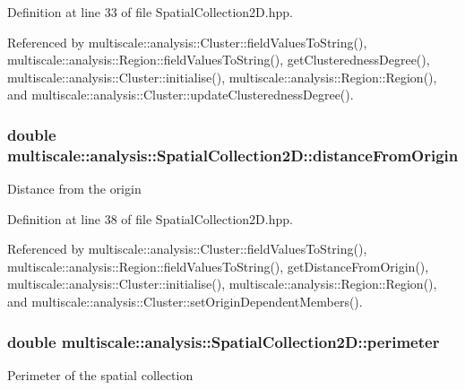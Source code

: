 Definition at line 33 of file Spatial\-Collection2\-D.\-hpp.



Referenced by multiscale\-::analysis\-::\-Cluster\-::field\-Values\-To\-String(), multiscale\-::analysis\-::\-Region\-::field\-Values\-To\-String(), get\-Clusteredness\-Degree(), multiscale\-::analysis\-::\-Cluster\-::initialise(), multiscale\-::analysis\-::\-Region\-::\-Region(), and multiscale\-::analysis\-::\-Cluster\-::update\-Clusteredness\-Degree().

\hypertarget{classmultiscale_1_1analysis_1_1SpatialCollection2D_ac2a5d3f8c2cb878c710d821c536b8a4f}{
\subsubsection[{distance\-From\-Origin}]{\setlength{\rightskip}{0pt plus 5cm}double multiscale\-::analysis\-::\-Spatial\-Collection2\-D\-::distance\-From\-Origin\hspace{0.3cm}{\ttfamily [protected]}}}\label{classmultiscale_1_1analysis_1_1SpatialCollection2D_ac2a5d3f8c2cb878c710d821c536b8a4f}
Distance from the origin 

Definition at line 38 of file Spatial\-Collection2\-D.\-hpp.



Referenced by multiscale\-::analysis\-::\-Cluster\-::field\-Values\-To\-String(), multiscale\-::analysis\-::\-Region\-::field\-Values\-To\-String(), get\-Distance\-From\-Origin(), multiscale\-::analysis\-::\-Cluster\-::initialise(), multiscale\-::analysis\-::\-Region\-::\-Region(), and multiscale\-::analysis\-::\-Cluster\-::set\-Origin\-Dependent\-Members().

\hypertarget{classmultiscale_1_1analysis_1_1SpatialCollection2D_ae8045702b66fd813cfff49fa86b02e68}{
\subsubsection[{perimeter}]{\setlength{\rightskip}{0pt plus 5cm}double multiscale\-::analysis\-::\-Spatial\-Collection2\-D\-::perimeter\hspace{0.3cm}{\ttfamily [protected]}}}\label{classmultiscale_1_1analysis_1_1SpatialCollection2D_ae8045702b66fd813cfff49fa86b02e68}
Perimeter of the spatial collection 

